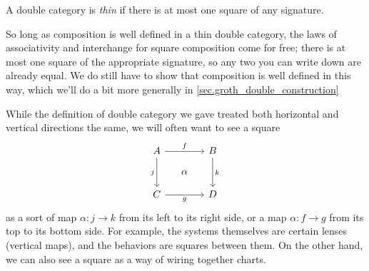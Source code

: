 \documentclass[DynamicalBook]{subfiles}
\begin{document}
\begin{definition}
  A double category is \emph{thin} if there is at most one square of any
  signature.
\end{definition}

So long as composition is well defined in a thin double category, the laws of
associativity and interchange for square composition come for free; there is at
most one square of the appropriate signature, so any two you can write down are
already equal. We do still have to show that composition is well defined in this
way, which we'll do a bit more generally in \cref{sec.groth_double_construction}

\begin{remark}\label{rmk.double_category_direction}
While the definition of double category we gave treated both horizontal and
vertical directions the same, we will often want to see a square
\[
  \begin{tikzcd}[sep=small]
    A \ar[dd, "j"'] \ar[rr, "f"] & & B \ar[dd, "k"] \\
    & \alpha & \\
    C \ar[rr, "g"'] & & D
  \end{tikzcd}
\]
as a sort of map $\alpha : j \to k$ from its left to its right side, or a map
$\alpha : f \to g$ from its top to its bottom side. For example, the systems
themselves are certain lenses (vertical maps), and the behaviors are squares
between them. On the other hand, we can also see a square as a way of wiring
together charts. 
\end{remark}
\end{document}
